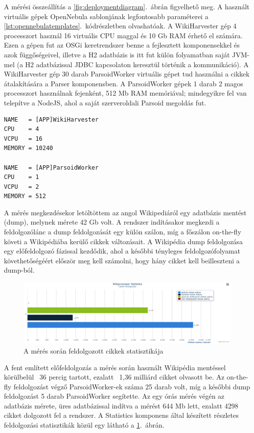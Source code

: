 A mérési összeállítás a \ref{fig:deploymentdiagram}.~ábrán figyelhető meg. A használt virtuális gépek OpenNebula sablonjának legfontosabb paraméterei a \ref{lst:opennebulatemplates}.~kódrészletben olvashatóak. A WikiHarvester gép 4 processzort használ 16 virtuális CPU maggal és 10 Gb RAM érhető el számára. Ezen a gépen fut az OSGi keretrendszer benne a fejlesztett komponensekkel és azok függőségeivel, illetve a H2 adatbázis is itt fut külön folyamatban saját JVM-mel (a H2 adatbázissal JDBC kapcsolaton keresztül történik a kommunikáció). A WikiHarvester gép 30 darab ParsoidWorker virtuális gépet tud használni a cikkek átalakítására a Parser komponensben. A ParsoidWorker gépek 1 darab 2 magos processzort használnak fejenként, 512 Mb RAM memóriával; mindegyikre fel van telepítve a NodeJS, ahol a saját szerveroldali Parsoid megoldás fut.

\begin{lstlisting}[label={lst:opennebulatemplates}, caption=Részlet a használt VM-ek sablonjából,breaklines=true]
NAME   = [APP]WikiHarvester
CPU    = 4
VCPU   = 16
MEMORY = 10240

NAME   = [APP]ParsoidWorker
CPU    = 1
VCPU   = 2
MEMORY = 512
\end{lstlisting}

A mérés megkezdésekor letöltöttem az angol Wikipediáról egy adatbázis mentést (dump), melynek mérete 42 Gb volt. A rendszer indításakor megkezdi a feldolgozólánc a dump feldolgozását egy külön szálon, míg a főszálon on-the-fly követi a Wikipédiába kerülő cikkek változásait. A Wikipédia dump feldolgozása egy előfeldolgozó fázissal kezdődik, ahol a későbbi tényleges feldolgozófolyamat követhetőségéért először meg kell számolni, hogy hány cikket kell beilleszteni a dump-ból. 

\begin{figure}[htp]
\centering
\includegraphics[scale=0.3]{img/storedarticles}
\caption{A mérés során feldolgozott cikkek statisztikája}
\label{fig:storedarticles}
\end{figure}

A fent említett előfeldolgozás a mérés során használt Wikipédia mentéssel körülbelül ~36 percig tartott, ezalatt ~1,36 milliárd cikket olvasott be. Az on-the-fly feldolgozást végző ParsoidWorker-ek száma 25 darab volt, míg a későbbi dump feldolgozást 5 darab ParsoidWorker segítette. Az egy órás mérés végén az adatbázis mérete, üres adatbázissal indítva a mérést 644 Mb lett, ezalatt 4298 cikket dolgozott fel a rendszer. A Statistics komponens által készített részletes feldolgozási statisztikák közül egy látható a \ref{fig:storedarticles}.~ábrán.

